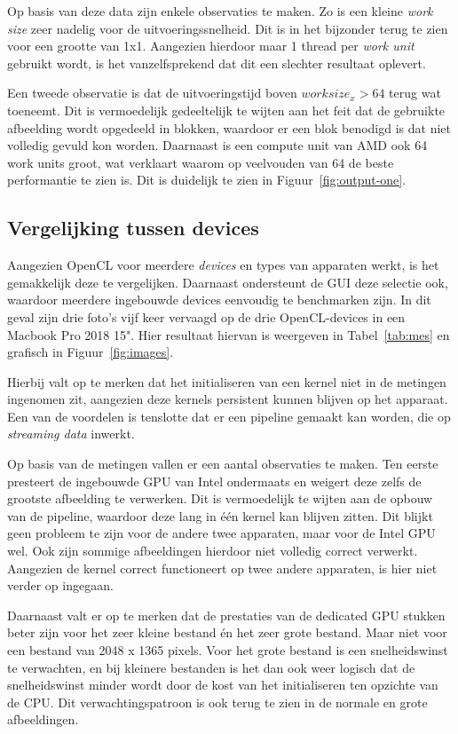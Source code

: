 \documentclass[twocolumn, a4paper]{article}
\begin{document}
Op basis van deze data zijn enkele observaties te maken. Zo is een kleine \emph{work size} zeer nadelig voor de uitvoeringssnelheid. Dit is in het bijzonder terug te zien voor een grootte van 1x1. Aangezien hierdoor maar 1 thread per \emph{work unit} gebruikt wordt, is het vanzelfsprekend dat dit een slechter resultaat oplevert.

Een tweede observatie is dat de uitvoeringstijd boven $work size_x > 64$ terug wat toeneemt. Dit is vermoedelijk gedeeltelijk te wijten aan het feit dat de gebruikte afbeelding wordt opgedeeld in blokken, waardoor er een blok benodigd is dat niet volledig gevuld kon worden. Daarnaast is een compute unit van AMD ook 64 work units groot, wat verklaart waarom op veelvouden van 64 de beste performantie te zien is. Dit is duidelijk te zien in Figuur~\ref{fig:output-one}.

\subsection{Vergelijking tussen devices}
Aangezien OpenCL voor meerdere \emph{devices} en types van apparaten werkt, is het gemakkelijk deze te vergelijken. Daarnaast ondersteunt de GUI deze selectie ook, waardoor meerdere ingebouwde devices eenvoudig te benchmarken zijn. In dit geval zijn drie foto's vijf keer vervaagd op de drie OpenCL-devices in een Macbook Pro 2018 15". Hier resultaat hiervan is weergeven in Tabel~\ref{tab:mes} en grafisch in Figuur~\ref{fig:images}.

Hierbij valt op te merken dat het initialiseren van een kernel niet in de metingen ingenomen zit, aangezien deze kernels persistent kunnen blijven op het apparaat. Een van de voordelen is tenslotte dat er een pipeline gemaakt kan worden, die op \emph{streaming data} inwerkt. 

Op basis van de metingen vallen er een aantal observaties te maken. Ten eerste presteert de ingebouwde GPU van Intel ondermaats en weigert deze zelfs de grootste afbeelding te verwerken. Dit is vermoedelijk te wijten aan de opbouw van de pipeline, waardoor deze lang in één kernel kan blijven zitten. Dit blijkt geen probleem te zijn voor de andere twee apparaten, maar voor de Intel GPU wel. Ook zijn sommige afbeeldingen hierdoor niet volledig correct verwerkt. Aangezien de kernel correct functioneert op twee andere apparaten, is hier niet verder op ingegaan.

Daarnaast valt er op te merken dat de prestaties van de dedicated GPU stukken beter zijn voor het zeer kleine bestand én het zeer grote bestand. Maar niet voor een bestand van 2048 x 1365 pixels. Voor het grote bestand is een snelheidswinst te verwachten, en bij kleinere bestanden is het dan ook weer logisch dat de snelheidswinst minder wordt door de kost van het initialiseren ten opzichte van de CPU. Dit verwachtingspatroon is ook terug te zien in de normale en grote afbeeldingen. 
\end{document}
